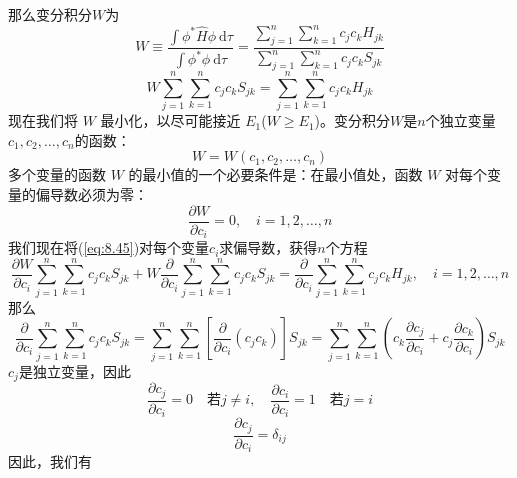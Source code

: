     那么变分积分$W$为
    \begin{equation}
        W \equiv \frac{\int \phi^{\ast} \hat{H} \phi\:\mathrm{d}\tau}{\int \phi^{\ast} \phi\:\mathrm{d}\tau} = \frac{\sum_{j=1}^{n}\sum_{k=1}^{n}c_jc_kH_{jk}}{\sum_{j=1}^{n}\sum_{k=1}^{n}c_jc_kS_{jk}}
        \label{eq:8.44}
    \end{equation}
    \begin{equation}
        W\sum_{j=1}^{n}\sum_{k=1}^{n}c_jc_kS_{jk} = \sum_{j=1}^{n}\sum_{k=1}^{n}c_jc_kH_{jk}
        \label{eq:8.45}
    \end{equation}
    现在我们将 $W$ 最小化，以尽可能接近 $E_1$($W \geq E_1$)。变分积分$W$是$n$个独立变量$c_1,c_2,\ldots,c_n$的函数：
    \begin{equation*}
        W = W\left(c_1,c_2,\ldots,c_n\right)
    \end{equation*}
    多个变量的函数 $W$ 的最小值的一个必要条件是：在最小值处，函数 $W$ 对每个变量的偏导数必须为零：
    \begin{equation}
        \frac{\partial W}{\partial c_i} = 0, \quad i = 1,2,\ldots,n
        \label{eq:8.46}
    \end{equation}
    我们现在将(\ref{eq:8.45})对每个变量$c_i$求偏导数，获得$n$个方程
    \begin{equation}
        \frac{\partial W}{\partial c_i}\sum_{j=1}^{n}\sum_{k=1}^{n}c_jc_kS_{jk} + W\frac{\partial}{\partial c_i}\sum_{j=1}^{n}\sum_{k=1}^{n}c_jc_kS_{jk} = \frac{\partial}{\partial c_i}\sum_{j=1}^{n}\sum_{k=1}^{n}c_jc_kH_{jk}, \quad i = 1,2,\ldots,n
        \label{eq:8.47}
    \end{equation}
    那么
    \begin{equation*}
        \frac{\partial}{\partial c_i}\sum_{j=1}^{n}\sum_{k=1}^{n}c_jc_kS_{jk} = \sum_{j=1}^{n}\sum_{k=1}^{n}\left[\frac{\partial}{\partial c_i}\left(c_jc_k\right)\right]S_{jk} = \sum_{j=1}^{n}\sum_{k=1}^{n}\left(c_k\frac{\partial c_j}{\partial c_i} + c_j\frac{\partial c_k}{\partial c_i}\right)S_{jk}
    \end{equation*}
    $c_j$是独立变量，因此
    \begin{equation*}
        \frac{\partial c_j}{\partial c_i} = 0 \quad \text{若} j \neq i, \quad \frac{\partial c_i}{\partial c_i} = 1
        \quad \text{若} j = i
    \end{equation*}
    \begin{equation}
        \frac{\partial c_j}{\partial c_i} = \delta_{ij}
        \label{eq:8.48}
    \end{equation}
    因此，我们有
